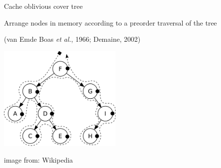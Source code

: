 \begin{frame}[fragile]{Cache oblivious cover tree}

Arrange nodes in memory according to a preorder traversal of the tree

(van Emde Boas \emph{et al.}, 1966; Demaine, 2002)
\vspace{0.1in}

\begin{center}
\includegraphics[width=6cm]{slides/covertree/preorder.png}
\end{center}

{\tiny image from: Wikipedia}
%
%


\end{frame}


